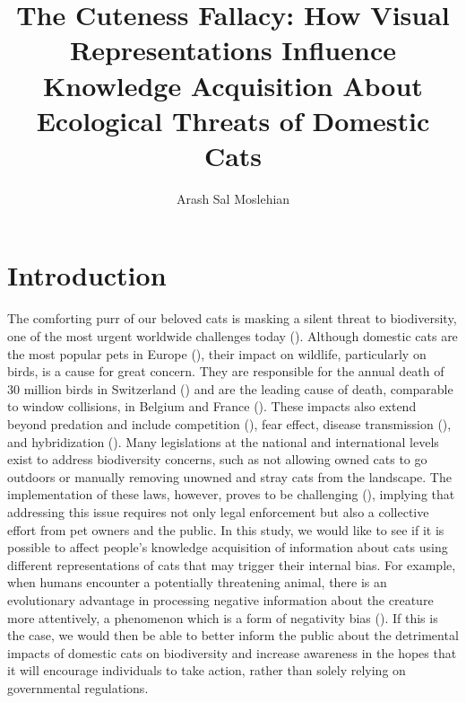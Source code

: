 \documentclass[
  man,
  longtable,
  nolmodern,
  notxfonts,
  notimes,
  colorlinks=true,linkcolor=blue,citecolor=blue,urlcolor=blue]{apa7}
\title{The Cuteness Fallacy: How Visual Representations Influence
Knowledge Acquisition About Ecological Threats of Domestic Cats}
\author{Arash Sal Moslehian}
\affiliation{
{Neuro-X, EPFL}}
\begin{document}
\maketitle


\setcounter{secnumdepth}{-\maxdimen} %

\setlength\LTleft{0pt}


\section{Introduction}\label{introduction}

The comforting purr of our beloved cats is masking a silent threat to
biodiversity, one of the most urgent worldwide challenges today
(). Although
domestic cats are the most popular pets in Europe
(), their impact on
wildlife, particularly on birds, is a cause for great concern. They are
responsible for the annual death of 30 million birds in Switzerland
() and
are the leading cause of death, comparable to window collisions, in
Belgium and France (). These impacts also extend beyond predation and include
competition (), fear
effect, disease transmission (), and hybridization
().
Many legislations at the national and international levels exist to
address biodiversity concerns, such as not allowing owned cats to go
outdoors or manually removing unowned and stray cats from the landscape.
The implementation of these laws, however, proves to be challenging
(),
implying that addressing this issue requires not only legal enforcement
but also a collective effort from pet owners and the public. In this
study, we would like to see if it is possible to affect people's
knowledge acquisition of information about cats using different
representations of cats that may trigger their internal bias. For
example, when humans encounter a potentially threatening animal, there
is an evolutionary advantage in processing negative information about
the creature more attentively, a phenomenon which is a form of
negativity bias (). If this is the case, we would then be able to better inform the
public about the detrimental impacts of domestic cats on biodiversity
and increase awareness in the hopes that it will encourage individuals
to take action, rather than solely relying on governmental regulations.
\end{document}
